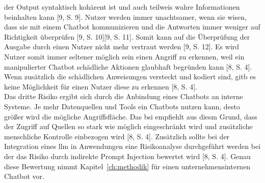 der Output syntaktisch kohärent ist und auch teilweis wahre Informationen beinhalten kann [9, S. 9]. Nutzer werden immer unachtsamer, wenn sie wisen, dass sie mit
einem Chatbot kommunizieren und die Antworten immer weniger auf Richtigkeit überprüfen [9, S. 10][9, S. 11]. Somit kann auf die Überprüfung der Ausgabe durch einen 
Nutzer nicht mehr vertraut werden [9, S. 12]. Es wird Nutzer somit immer seltener möglich sein einen Angriff zu erkennen, weil ein manipulierter Chatbot schädliche 
Aktionen glaubhaft begründen kann [8, S. 4]. Wenn zusätzlich die schädlichen Anweisungen versteckt und kodiert sind, gitb es keine Möglichkeit für einen Nutzer 
diese zu erkennen [8, S. 4]. \\
Das dritte Risiko ergibt sich durch die Anbindung eines Chatbots an interne Systeme. Je mehr Datenquellen und Tools ein Chatbots nutzen kann, desto größer wird die 
mögliche Angriffsfläche. Das \ac{bsi} empfiehlt aus diesm Grund, dass der Zugriff auf Quellen so stark wie möglich eingeschränkt wird und zusätzliche menschliche 
Kontrolle einbezogen wird [8, S. 4]. Zusätzlich sollte bei der Integration eines \ac{llm} in Anwendungen eine Risikoanalyse durchgeführt werden bei der das Risiko 
durch indirekte Prompt Injection bewertet wird [8, S. 4]. Genau diese Bewertung nimmt Kapitel~\ref{ch:methodik} für einen unternehmensinternen Chatbot vor.